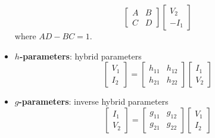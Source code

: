 \documentclass{article}
\begin{document}
\begin{itemize}
\begin{equation*}
\begin{bmatrix}
                  A & B \\
                  C & D
              \end{bmatrix}
              \begin{bmatrix}
                  V_2 \\
                  -I_1
              \end{bmatrix}
          \end{equation*}
          where \(AD - BC = 1\).
    \item \textbf{\(h\)-parameters}: hybrid parameters
          \begin{equation*}
              \begin{bmatrix}
                  V_1 \\
                  I_2
              \end{bmatrix}
              =
              \begin{bmatrix}
                  h_{11} & h_{12} \\
                  h_{21} & h_{22}
              \end{bmatrix}
              \begin{bmatrix}
                  I_1 \\
                  V_2
              \end{bmatrix}
          \end{equation*}
    \item \textbf{\(g\)-parameters}: inverse hybrid parameters
          \begin{equation*}
              \begin{bmatrix}
                  I_1 \\
                  V_2
              \end{bmatrix}
              =
              \begin{bmatrix}
                  g_{11} & g_{12} \\
                  g_{21} & g_{22}
              \end{bmatrix}
              \begin{bmatrix}
                  V_1 \\
                  I_2
              \end{bmatrix}
          \end{equation*}
\end{itemize}
\end{document}
